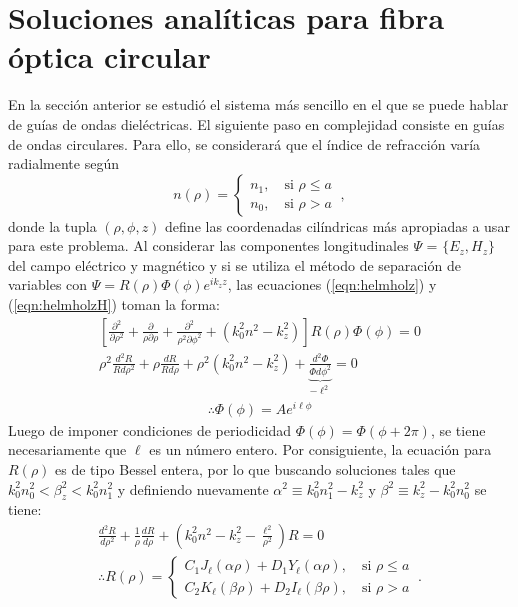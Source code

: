 \section{Soluciones analíticas para fibra óptica circular}
En la sección anterior se estudió el sistema más sencillo en el que se puede hablar de guías de ondas dieléctricas. El siguiente paso en complejidad consiste en guías de ondas circulares. Para ello, se considerará que el índice de refracción varía radialmente según 
\begin{equation}
	n( \rho ) = 
	\left\{\begin{matrix}
	n_1, \quad \text{si } \rho \le a
	\\
	n_0, \quad \text{si } \rho > a
	\end{matrix}\right.
	\ ,\nonumber
\end{equation}
donde la tupla $(\rho, \phi, z)$ define las coordenadas cilíndricas más apropiadas a usar para este problema. 
Al considerar las componentes longitudinales $\Psi$ = $\{E_z, H_z\}$ del campo eléctrico y magnético y  si se utiliza el método de separación de variables con $\Psi =  R(\rho)\Phi(\phi) e^{ik_z z} $,  las ecuaciones (\ref{eqn:helmholz}) y (\ref{eqn:helmholzH}) toman la forma:
\begin{align}
	\left[\frac{\partial^2}{\partial \rho^2} + \frac{\partial}{\rho\partial \rho} + \frac{\partial^2}{\rho^2\partial \phi^2} +\left( k_0^2n^2 - k_z^2 \right)\right]  R(\rho)\Phi(\phi) = 0
	\nonumber
	\\
\rho^2\frac{d^2 R}{Rd\rho^2} + \rho\frac{dR}{Rd\rho} + \rho^2\left( k_0^2n^2 - k_z^2 \right) + \underbrace{\frac{d^2 \Phi}{\Phi d\phi^2}}_{-\ell^2} = 0
\nonumber
\end{align}
\vspace{-3em}
\begin{align}
\therefore \Phi(\phi) = A e^{i\ell\phi}
\nonumber
\end{align}
Luego de imponer condiciones de periodicidad $\Phi(\phi)=\Phi(\phi + 2\pi)$, se tiene necesariamente que $\ell$ es un número entero. Por consiguiente, la ecuación para $R(\rho)$ es de tipo Bessel entera, por lo que buscando soluciones tales que $k_0^2 n_0^2 < \beta_z^2 < k_0^2 n_1^2$ y definiendo nuevamente $\alpha^2 \equiv k_0^2n_1^2 - k_z^2$ y $\beta^2\equiv k_z^2 - k_0^2n_0^2$ se tiene:
\begin{align}
	\frac{d^2 R}{d\rho^2} + \frac{1}{\rho}\frac{dR}{d\rho} + \left( k_0^2n^2 - k_z^2 -\frac{\ell^2}{\rho^2}\right)R  = 0
	\nonumber
	\\
	\therefore R(\rho) = 
	\left\{
	\begin{matrix}	
	C_1 J_\ell (\alpha\rho) + D_1 Y_\ell (\alpha\rho), \quad \text{si } \rho \le a  
	\\
	C_2 K_\ell (\beta\rho) + D_2 I_\ell (\beta\rho), \quad \text{si } \rho > a  
	\end{matrix}
	\right.
	\ . \nonumber
\end{align}
